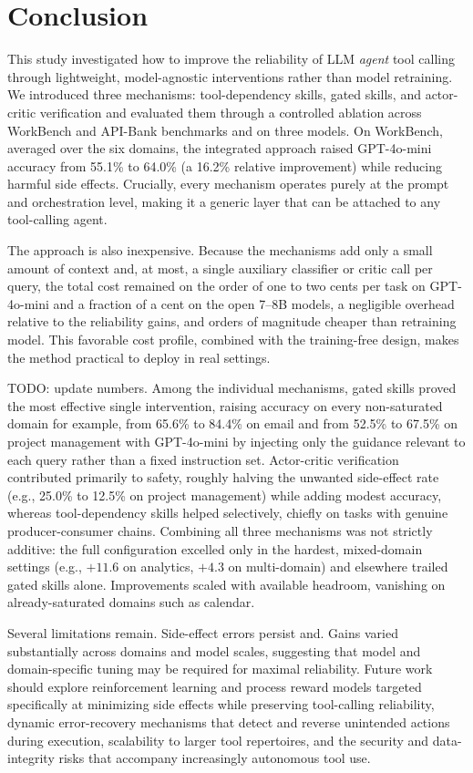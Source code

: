 \section{Conclusion}

This study investigated how to improve the reliability of LLM \emph{agent} tool calling
through lightweight, model-agnostic interventions rather than model retraining. We introduced three
mechanisms: tool-dependency skills, gated skills, and
actor-critic verification and evaluated them through a controlled ablation across WorkBench and API-Bank benchmarks
 and on three models. On WorkBench, averaged over the six domains, the integrated approach raised
GPT-4o-mini accuracy from 55.1\% to 64.0\% (a 16.2\% relative improvement) while reducing
harmful side effects. Crucially, every mechanism operates purely at the prompt and orchestration
level, making it a generic layer that can be attached to any tool-calling agent.

The approach is also inexpensive. Because the mechanisms add only a small amount of context and,
at most, a single auxiliary classifier or critic call per query, the total cost remained on the
order of one to two cents per task on GPT-4o-mini and a fraction of a cent on the open
7--8B models, a negligible overhead relative to the reliability gains, and orders of magnitude
cheaper than retraining model. This favorable cost profile, combined with
the training-free design, makes the method practical to deploy in real settings.

TODO: update numbers. Among the individual mechanisms, gated skills proved the most effective single intervention,
raising accuracy on every non-saturated domain for example, from 65.6\% to 84.4\% on email
and from 52.5\% to 67.5\% on project management with GPT-4o-mini by injecting only the
guidance relevant to each query rather than a fixed instruction set. Actor-critic verification
contributed primarily to safety, roughly halving the unwanted side-effect rate (e.g., 25.0\% to
12.5\% on project management) while adding modest accuracy, whereas tool-dependency skills helped
selectively, chiefly on tasks with genuine producer-consumer chains. Combining all three
mechanisms was not strictly additive: the full configuration excelled only in the hardest,
mixed-domain settings (e.g., $+11.6$ on analytics, $+4.3$ on multi-domain) and elsewhere trailed
gated skills alone. Improvements scaled with available headroom, vanishing on already-saturated
domains such as calendar.

Several limitations remain. Side-effect errors persist and. Gains varied
substantially across domains and model scales, suggesting that model and domain-specific tuning
may be required for maximal reliability. Future work should explore reinforcement learning and
process reward models targeted specifically at minimizing side effects while preserving
tool-calling reliability, dynamic error-recovery mechanisms that detect and reverse unintended
actions during execution, scalability to larger tool repertoires, and the security and
data-integrity risks that accompany increasingly autonomous tool use. 

